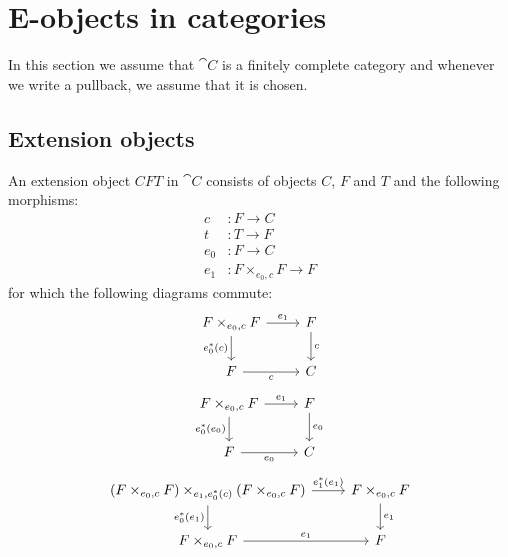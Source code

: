 \section{E-objects in categories}
In this section we assume that $\cat{C}$ is a finitely complete category and
whenever we write a pullback, we assume that it is chosen.

\subsection{Extension objects}
\begin{defn}
An extension object $CFT$ in $\cat{C}$ consists of objects $C$, $F$ and $T$ and the
following morphisms:
\begin{align*}
c &:F\to C\\
t &:T\to F\\
e_0 &:F\to C\\
e_1 & :F\times_{e_0,c} F\to F
\end{align*}
for which the following diagrams commute:
\begin{equation*}
\begin{tikzcd}
F\times_{e_0,c} F \ar{r}{e_1} \ar{d}[swap]{e_0^\ast(c)} & F \ar{d}{c}\\
F \ar{r}[swap]{c} & C
\end{tikzcd}
\end{equation*}
\begin{equation*}
\begin{tikzcd}
F\times_{e_0,c} F \ar{d}[swap]{e_0^\ast(e_0)} \ar{r}{e_1} & F \ar{d}{e_0}\\
F \ar{r}[swap]{e_0} & C
\end{tikzcd}
\end{equation*}
\begin{equation*}
\begin{tikzcd}
(F\times_{e_0,c} F)\times_{e_1,e_0^\ast(c)}(F\times_{e_0,c} F) 
  \ar{d}[swap]{e_0^\ast(e_1)}
  \ar{r}{e_1^\ast(e_1)}
& F\times_{e_0,c} F \ar{d}{e_1} \\
F\times_{e_0,c} F \ar{r}{e_1} & F
\end{tikzcd}
\end{equation*}
\end{defn}


